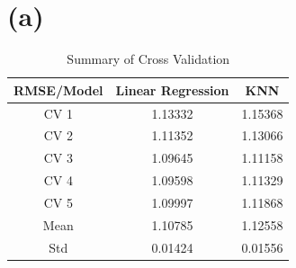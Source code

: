 
\usepackage{graphicx}
\usepackage{float}
\usepackage{multicol}
\usepackage{balance}
\usepackage{multicol}
\usepackage{multirow}
\usepackage{epstopdf}
\usepackage{epsfig}
\usepackage{makeidx}
\usepackage{bm}
\usepackage{pbox}
\usepackage{pdflscape}
\usepackage{url}
\usepackage{framed}
\usepackage{mathtools}
\usepackage{adjustbox}
\usepackage{amsmath}
\usepackage{hyperref}
\usepackage{subcaption}
\usepackage{cite}
\usepackage{amsfonts}

\usepackage{graphicx, amssymb, amsmath, listings, float, mathtools}
\usepackage{color, url}
\lstset{language = Python}
\lstset{breaklines}
\lstset{extendedchars=false}

\oddsidemargin 0in
\evensidemargin 0in
\textwidth 6.5in
\topmargin -0.6in
\textheight 9.0in





\section*{(a)}

\begin{table}[htb]
 \caption{Summary of Cross Validation} \label{result}
 \vspace{0.1in}
\begin{center}
  \begin{tabular}{  c  c  c}
    \hline
    RMSE/Model        & Linear Regression        & KNN      \\ \hline
    CV 1                     & 1.13332                           & 1.15368 \\ \hline
    CV 2                    & 1.11352                            & 1.13066 \\ \hline
    CV 3                    & 1.09645                           & 1.11158 \\ \hline
    CV 4                    & 1.09598                           & 1.11329 \\ \hline
    CV 5                    & 1.09997                           & 1.11868  \\ \hline
    Mean                   & 1.10785                           &  1.12558 \\ \hline 
    Std                      & 0.01424                           &  0.01556 \\ \hline 
  \end{tabular}
\end{center}
\end{table}

